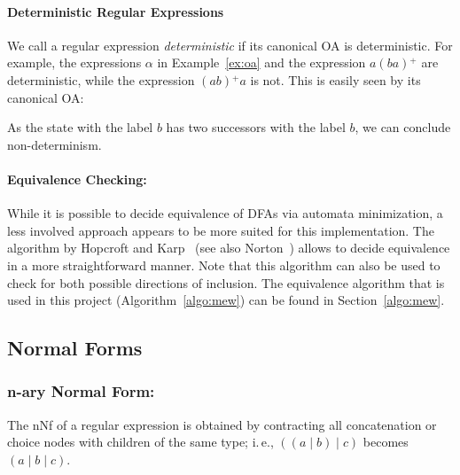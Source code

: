 \documentclass[a4paper,11pt, svgnames,titlepage]{article}
\newcommand{\rxp}{{^\mathtt{+}}}
\DeclareMathOperator{\ror}{\mathtt{|}}
\begin{document}
\paragraph{Deterministic Regular Expressions} We call a regular expression \emph{deterministic} if its canonical OA is deterministic. For example, the expressions $\alpha$ in Example~\ref{ex:oa} and the expression $a(ba)\rxp$ are deterministic, while the expression $(ab)\rxp a$ is not. This is easily seen by its canonical OA:
\begin{center}
\end{center}
As the state with the label $b$ has two successors with the label $b$, we can conclude non-determinism. 

\paragraph{Equivalence Checking:} While it is possible to decide equivalence of DFAs via automata minimization, a less involved approach appears to be more suited for this implementation. The algorithm by Hopcroft and Karp~\cite{hop:lin} (see also Norton~\cite{nor:alg}) allows to decide equivalence in a more straightforward manner. Note that this algorithm can also be used to check for both possible directions of inclusion. The equivalence algorithm that is used in this project (Algorithm~\ref{algo:mew}) can be found in Section~\ref{algo:mew}.
\subsection{Normal Forms}
\subsubsection{n-ary Normal Form:} The nNf of a regular expression is obtained by contracting all concatenation or choice nodes with children of the same type; i.\,e., $((a\ror b)\ror c)$ becomes $(a \ror b \ror c)$.
\end{document}
